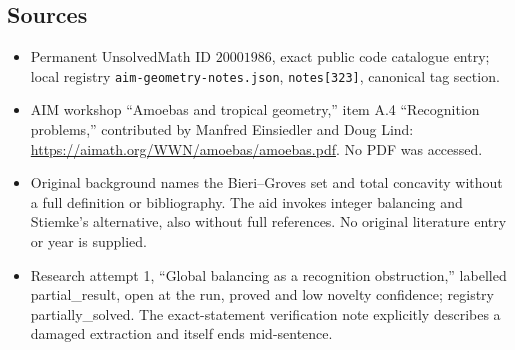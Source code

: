 \documentclass[11pt]{article}
\begin{document}
\subsection{Sources}
\begin{itemize}
\item Permanent UnsolvedMath ID \(20001986\), exact public code catalogue entry; local registry \texttt{aim-geometry-notes.json}, \texttt{notes[323]}, canonical tag section.
\item AIM workshop ``Amoebas and tropical geometry,'' item A.4 ``Recognition problems,'' contributed by Manfred Einsiedler and Doug Lind: \url{https://aimath.org/WWN/amoebas/amoebas.pdf}. No PDF was accessed.
\item Original background names the Bieri--Groves set and total concavity without a full definition or bibliography. The aid invokes integer balancing and Stiemke's alternative, also without full references. No original literature entry or year is supplied.
\item Research attempt 1, ``Global balancing as a recognition obstruction,'' labelled partial\_result, open at the run, proved and low novelty confidence; registry partially\_solved. The exact-statement verification note explicitly describes a damaged extraction and itself ends mid-sentence.
\end{itemize}
\end{document}
